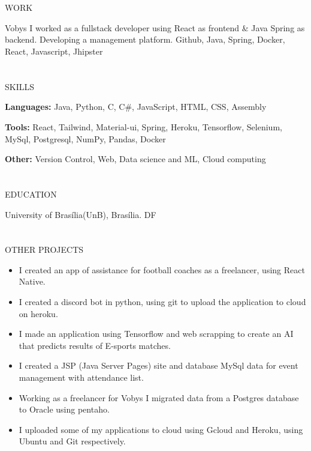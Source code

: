 \documentclass{my_cv}
\begin{document}
\begin{multicols}{2}
\section{\faPencil}{WORK}
    
%
    {Vobys}%
    {I worked as a fullstack developer using React as frontend \& Java Spring as backend.
    Developing a management platform.}%
    {Github, Java, Spring, Docker, React, Javascript, Jhipster}
    
\section{\faList}{SKILLS}

\textbf{Languages:} Java, Python, C, C\#, JavaScript, HTML, CSS, Assembly

\noindent\textbf{Tools:} React, Tailwind, Material-ui, Spring, Heroku, Tensorflow, Selenium, MySql, Postgresql, NumPy, Pandas, Docker

\noindent\textbf{Other:} Version Control, Web, Data science and ML, Cloud computing



\section{\faGraduationCap}{EDUCATION}

{University of Brasília(UnB), Brasília. DF} %
{}

\section{\faPaintBrush}{OTHER PROJECTS}
\begin{itemize}[noitemsep]
    \item I created an app of assistance for football coaches as a freelancer, using React Native.
    \item I created a discord bot in python, using git to upload the application to cloud on heroku.
    \item I made an application using Tensorflow and web scrapping to create an AI that predicts results of E-sports matches.
    \item I created a JSP (Java Server Pages) site and database MySql data for event management with attendance list.
    \item Working as a freelancer for Vobys I migrated data from a Postgres database to
Oracle using pentaho.
    \item I uploaded some of my applications to cloud using Gcloud and Heroku, using Ubuntu and Git respectively.
\end{itemize}


\end{multicols}
\end{document}
